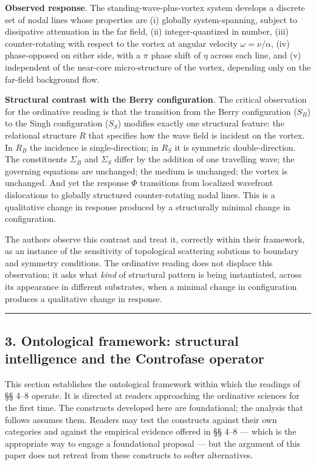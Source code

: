 \documentclass[
  11pt,
  a4paper,
]{article}
\begin{document}
\textbf{Observed response}. The standing-wave-plus-vortex system
develops a discrete set of nodal lines whose properties are (i) globally
system-spanning, subject to dissipative attenuation in the far field,
(ii) integer-quantized in number, (iii) counter-rotating with respect to
the vortex at angular velocity \(\omega = \nu / \alpha\), (iv)
phase-opposed on either side, with a \(\pi\) phase shift of \(\eta\)
across each line, and (v) independent of the near-core micro-structure
of the vortex, depending only on the far-field background flow.

\textbf{Structural contrast with the Berry configuration}. The critical
observation for the ordinative reading is that the transition from the
Berry configuration (\(S_B\)) to the Singh configuration (\(S_S\))
modifies exactly one structural feature: the relational structure \(R\)
that specifies how the wave field is incident on the vortex. In \(R_B\)
the incidence is single-direction; in \(R_S\) it is symmetric
double-direction. The constituents \(\Sigma_B\) and \(\Sigma_S\) differ
by the addition of one travelling wave; the governing equations are
unchanged; the medium is unchanged; the vortex is unchanged. And yet the
response \(\Phi\) transitions from localized wavefront dislocations to
globally structured counter-rotating nodal lines. This is a qualitative
change in response produced by a structurally minimal change in
configuration.

The authors observe this contrast and treat it, correctly within their
framework, as an instance of the sensitivity of topological scattering
solutions to boundary and symmetry conditions. The ordinative reading
does not displace this observation; it asks what \emph{kind} of
structural pattern is being instantiated, across its appearance in
different substrates, when a minimal change in configuration produces a
qualitative change in response.

\begin{center}\rule{0.5\linewidth}{0.5pt}\end{center}

\subsection{3. Ontological framework: structural intelligence and the
Controfase
operator}\label{ontological-framework-structural-intelligence-and-the-controfase-operator}

This section establishes the ontological framework within which the
readings of §§ 4--8 operate. It is directed at readers approaching the
ordinative sciences for the first time. The constructs developed here
are foundational; the analysis that follows assumes them. Readers may
test the constructs against their own categories and against the
empirical evidence offered in §§ 4--8 --- which is the appropriate way
to engage a foundational proposal --- but the argument of this paper
does not retreat from these constructs to softer alternatives.
\end{document}
